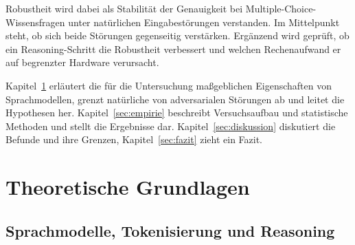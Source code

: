 \documentclass[a4paper,titlepage]{article}
\numberwithin{equation}{section} %
\begin{document}
Robustheit wird dabei als Stabilität der Genauigkeit bei Multiple-Choice-Wissensfragen unter natürlichen Eingabestörungen verstanden. Im Mittelpunkt steht, ob sich beide Störungen gegenseitig verstärken. Ergänzend wird geprüft, ob ein Reasoning-Schritt die Robustheit verbessert und welchen Rechenaufwand er auf begrenzter Hardware verursacht.

Kapitel~\ref{sec:grundlagen} erläutert die für die Untersuchung maßgeblichen Eigenschaften von Sprachmodellen, grenzt natürliche von adversarialen Störungen ab und leitet die Hypothesen her. Kapitel~\ref{sec:empirie} beschreibt Versuchsaufbau und statistische Methoden und stellt die Ergebnisse dar. Kapitel~\ref{sec:diskussion} diskutiert die Befunde und ihre Grenzen, Kapitel~\ref{sec:fazit} zieht ein Fazit.
\newpage


\section{Theoretische Grundlagen}\label{sec:grundlagen}


\subsection{Sprachmodelle, Tokenisierung und Reasoning}\label{sec:sprachmodelle}
\end{document}
